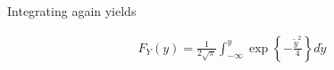 \documentclass[12pt,english]{article}
\begin{document}
Integrating again yields

\begin{align*}
F_{Y}(y) = \frac{1}{2\sqrt{\pi}} \int_{-\infty}^{y} \exp \left\{ -\frac{\widetilde{y}^{2}}{4} \right\} d \widetilde{y}
\end{align*}

\begin{comment}
\vspace{1em}
\noindent
c) What is the joint distribution $G$ of $X_{1}$ and $Y$? What is the joint density $g$? \\

\begin{align*}
G(x_{1}, y) & = F(x_{1}, y - x_{1}) \\
& = \Phi(x_{1}) \Phi(y - x_{1})
\end{align*}

\begin{align*}
g(x_{1}, y) & = \frac{\partial}{\partial x_{1}} \frac{\partial}{\partial y} G(x_{1}, y) \\
& = \frac{\partial}{\partial x_{1}} \Phi(x_{1}) \phi(y - x_{1}) \\
& = \phi(x_{1}) \phi(y - x_{1}) - \Phi(x_{1}) \phi'(y - x_{1})
\end{align*}
\end{comment}
\end{document}
